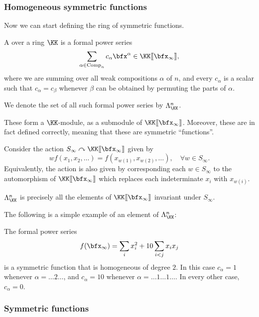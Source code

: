 \documentclass{article}
\newcommand{\fps}[2]{#1 [\kern-1.2pt[ {#2} ]\kern-1.2pt]}
\DeclareMathOperator{\Com}{Comp}
\begin{document}
\subsubsection{Homogeneous symmetric functions}

Now we can start defining the ring of symmetric functions.

\begin{definition}
    A  over a ring $\KK$ is a formal power series
    \[
        \sum_{\alpha \in \Com_n}
        c_\alpha \bfx^\alpha
        \in \fps{\KK}{\bfx_\infty},
    \]
    where we are summing over all weak compositions $\alpha$ of $n$, and every $c_\alpha$ is a scalar such that $c_\alpha = c_\beta$ whenever $\beta$ can be obtained by permuting the parts of $\alpha$.
    
    We denote the set of all such formal power series by $\Lambda_\KK^n$.
\end{definition}

These form a $\KK$-module, as a submodule of $\fps{\KK}{\bfx_\infty}$.
Moreover, these are in fact defined correctly, meaning that these are symmetric ``functions''.

\begin{remark}
    Consider the action $S_\infty \curvearrowright \fps{\KK}{\bfx_\infty}$ given by
    \[
        wf(x_1,x_2,\ldots)
        =
        f(x_{w(1)},x_{w(2)},\ldots), \quad \forall w \in S_\infty.
    \]
    Equivalently, the action is also given by corresponding each $w \in S_\infty$ to the automorphism of $\fps{\KK}{\bfx_\infty}$ which replaces each indeterminate $x_i$ with $x_{w(i)}$.

    $\Lambda_{\KK}^n$ is precisely all the elements of $\fps{\KK}{\bfx_\infty}$ invariant under $S_\infty$.
\end{remark}

The following is a simple example of an element of $\Lambda_\KK^n$:

\begin{example}
    The formal power series 
    \[
        f(\bfx_\infty)
        =
        \sum_i
        x_i^2 
        + 10\sum_{i < j}
        x_ix_j
    \]
    is a symmetric function that is homogeneous of degree $2$. In this case $c_\alpha = 1$ whenever $\alpha = \ldots 2 \ldots$, and $c_\alpha = 10$ whenever $\alpha = \ldots 1 \ldots 1 \ldots$.
    In every other case, $c_\alpha = 0$.
\end{example}

\subsubsection{Symmetric functions}
\end{document}
